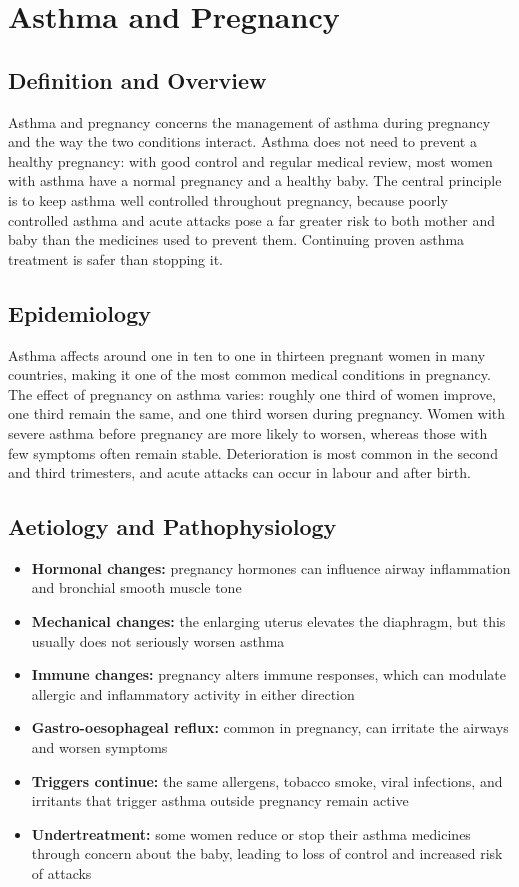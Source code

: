 \chapter{Asthma and Pregnancy}

\section*{Definition and Overview}
Asthma and pregnancy concerns the management of asthma during pregnancy and the way the two conditions interact. Asthma does not need to prevent a healthy pregnancy: with good control and regular medical review, most women with asthma have a normal pregnancy and a healthy baby. The central principle is to keep asthma well controlled throughout pregnancy, because poorly controlled asthma and acute attacks pose a far greater risk to both mother and baby than the medicines used to prevent them. Continuing proven asthma treatment is safer than stopping it.

\section*{Epidemiology}
Asthma affects around one in ten to one in thirteen pregnant women in many countries, making it one of the most common medical conditions in pregnancy. The effect of pregnancy on asthma varies: roughly one third of women improve, one third remain the same, and one third worsen during pregnancy. Women with severe asthma before pregnancy are more likely to worsen, whereas those with few symptoms often remain stable. Deterioration is most common in the second and third trimesters, and acute attacks can occur in labour and after birth.

\section*{Aetiology and Pathophysiology}
\begin{itemize}
    \item \textbf{Hormonal changes:} pregnancy hormones can influence airway inflammation and bronchial smooth muscle tone
    \item \textbf{Mechanical changes:} the enlarging uterus elevates the diaphragm, but this usually does not seriously worsen asthma
    \item \textbf{Immune changes:} pregnancy alters immune responses, which can modulate allergic and inflammatory activity in either direction
    \item \textbf{Gastro-oesophageal reflux:} common in pregnancy, can irritate the airways and worsen symptoms
    \item \textbf{Triggers continue:} the same allergens, tobacco smoke, viral infections, and irritants that trigger asthma outside pregnancy remain active
    \item \textbf{Undertreatment:} some women reduce or stop their asthma medicines through concern about the baby, leading to loss of control and increased risk of attacks
\end{itemize}

